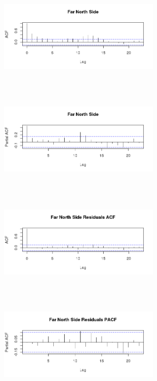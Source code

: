 \documentclass{article} %
\begin{document}
\begin{multicols}{2} 
\begin{figure}[H]
\includegraphics[height=50mm, width=80mm]{Plots/far_north_ACF.png}
\end{figure}
 
\begin{figure}[H]
\includegraphics[height=50mm, width=80mm]{Plots/far_north_PACF.png}
\end{figure}
 
\begin{figure}[H]
\includegraphics[height=50mm, width=80mm]{Plots/far_north_resids_ACF.png}
\end{figure}
 
\begin{figure}[H]
\includegraphics[height=50mm, width=80mm]{Plots/far_north_resids_PACF.png}
\end{figure}
 \end{multicols}
 
\end{document}
